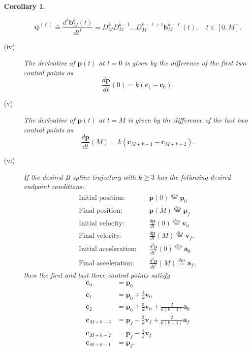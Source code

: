 \documentclass{article}
\newtheorem{corollary}[theorem]{Corollary}
\newcommand{\defeq}{\circeq}
\newcommand{\bbf}{\mathbf{b}}
\newcommand{\cbf}{\mathbf{c}}
\begin{document}
\begin{corollary}
\begin{description}
\[			\boldsymbol{\psi}^{(\ell)} \defeq \frac{d^{\ell}\bbf_M^k(t)}{dt^{\ell}} = D_M^k D_M^{k-1} \dots D_M^{k-\ell+1} \bbf_M^{k-\ell}(t), \quad t\in [0, M].
		\]
	\item[(iv)] The derivative of $\mathbf{p}(t)$ at $t=0$ is given by the difference of the first two control points as
		\[
			\frac{d\mathbf{p}}{dt}(0) = k(\cbf_1 - \cbf_0).
		\]
	\item[(v)] The derivative of $\mathbf{p}(t)$ at $t=M$ is given by the difference of the last two control points as
		\[
			\frac{d\mathbf{p}}{dt}(M) = k(\cbf_{M+k-1} - \cbf_{M+k-2}).
		\]
	\item[(vi)] If the desired B-spline trajectory with $k\geq 3$ has the following desired endpoint conditions:
		\begin{align*}
			\text{Initial position:} &\quad \mathbf{p}(0) \stackrel{des}{=} \mathbf{p}_0 \\	
			\text{Final position:} &\quad \mathbf{p}(M) \stackrel{des}{=} \mathbf{p}_f \\
			\text{Initial velocity:} &\quad \frac{d\mathbf{p}}{dt}(0) \stackrel{des}{=} \mathbf{v}_0 \\	
			\text{Final velocity:} &\quad \frac{d\mathbf{p}}{dt}(M) \stackrel{des}{=} \mathbf{v}_f, \\
			\text{Initial acceleration:} &\quad \frac{d^2\mathbf{p}}{dt^2}(0) \stackrel{des}{=} \mathbf{a}_0 \\	
			\text{Final acceleration:} &\quad \frac{d^2\mathbf{p}}{dt^2}(M) \stackrel{des}{=} \mathbf{a}_f,
		\end{align*}
		then the first and last three control points satisfy
		\begin{align*}
			\cbf_0 &= \mathbf{p}_0 \\
			\cbf_1 &= \mathbf{p}_0 + \frac{1}{k} \mathbf{v}_0 \\
			\cbf_2 &= \mathbf{p}_0 + \frac{3}{k} \mathbf{v}_0 + \frac{2}{k(k-1)}\mathbf{a}_0 \\
			\cbf_{M+k-3} &= \mathbf{p}_f - \frac{3}{k}\mathbf{v}_f + \frac{2}{k(k-1)}\mathbf{a}_f \\
			\cbf_{M+k-2} &= \mathbf{p}_f - \frac{1}{k}\mathbf{v}_f \\
			\cbf_{M+k-1} &= \mathbf{p}_f.
		\end{align*}
	\end{description}
\end{corollary}


\end{document}

